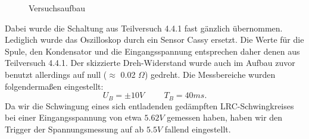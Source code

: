 \documentclass[12pt,a4paper]{article}
\begin{document}
\begin{figure}[H]
\caption{Versuchsaufbau}
\end{figure}

Dabei wurde die Schaltung aus Teilversuch 4.4.1 fast gänzlich übernommen. Lediglich wurde das Oszilloskop durch ein Sensor Cassy ersetzt. Die Werte für die Spule, den Kondensator und die Eingangsspannung entsprechen daher denen aus Teilversuch 4.4.1.
Der skizzierte Dreh-Widerstand wurde auch im Aufbau zuvor benutzt allerdings auf null ($\approx$ 0.02 $\Omega$) gedreht.
\newline
Die Messbereiche wurden folgendermaßen eingestellt:
\begin{equation}
U_B=\pm 10 V \hspace{1cm} T_B=40 ms.
\end{equation}
Da wir die Schwingung eines sich entladenden gedämpften LRC-Schwingkreises bei einer Eingangsspannung von etwa $5.62V$ gemessen haben, haben wir den Trigger der Spannungsmessung auf ab $5.5V$ fallend eingestellt.
\newline
\end{document}
